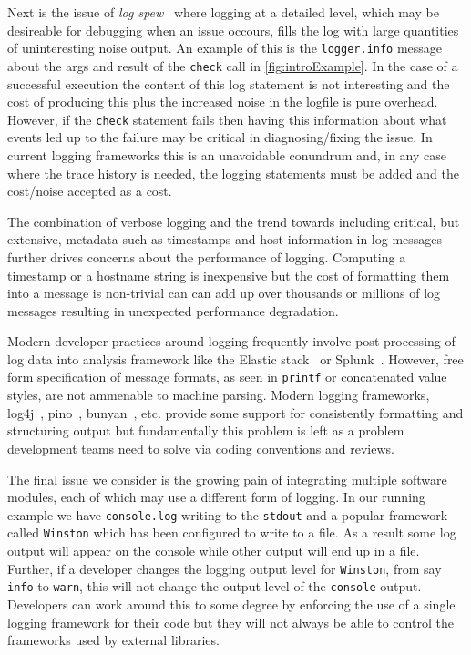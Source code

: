 \documentclass[sigplan,10pt,review]{acmart}
\begin{document}
Next is the issue of \emph{log spew}~\cite{learnlog,logstudy2} where logging at a detailed level, which 
may be desireable for debugging when an issue occours, fills the log with 
large quantities of uninteresting noise output. An example of this is the 
\texttt{logger.info} message about the args and result of the \texttt{check} 
call in \autoref{fig:introExample}. In the case of a successful execution the content of this log statement 
is not interesting and the cost of producing this plus the increased noise in 
the logfile is pure overhead. However, if the \texttt{check} statement fails 
then having this information about what events led up to the failure may be 
critical in diagnosing/fixing the issue. In current logging frameworks this is 
an unavoidable conundrum and, in any case where the trace history is needed, 
the logging statements must be added and the cost/noise accepted as a cost.

The combination of verbose logging and the trend towards including critical, but 
extensive, metadata such as timestamps and host information in log messages further 
drives concerns about the performance of logging. Computing a timestamp or a 
hostname string is inexpensive but the cost of formatting them into a message is 
non-trivial can can add up over thousands or millions of log messages resulting 
in unexpected performance degradation. 

Modern developer practices around logging frequently involve post processing 
of log data into analysis framework like the Elastic stack~\cite{elastic} or Splunk~\cite{splunk}. 
However, free form specification of message formats, as seen in \texttt{printf} or 
concatenated value styles, are not ammenable to machine parsing. Modern logging 
frameworks, log4j~\cite{log4j}, pino~\cite{pino}, bunyan~\cite{bunyan}, etc. 
provide some support for consistently formatting and structuring output but
fundamentally this problem is left as a problem development teams need to solve
via coding conventions and reviews.

The final issue we consider is the growing pain of integrating multiple software 
modules, each of which may use a different form of logging. In our running example 
we have \texttt{console.log} writing to the \texttt{stdout} and a
popular framework called \texttt{Winston} which has been configured to write to
a file. As a result some log output will appear on the console while other
output will end up in a file. Further, if a developer changes the logging output
level for \texttt{Winston}, from say \texttt{info} to \texttt{warn}, this will
not change the output level of the \texttt{console} output. Developers can work
around this to some degree by enforcing the use of a single logging framework
for their code but they will not always be able to control the frameworks used
by external libraries.
\end{document}
